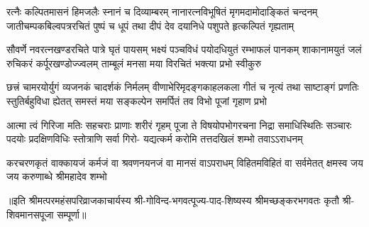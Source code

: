 
\fourlineindentedshloka
{रत्नैः कल्पितमासनं हिमजलैः स्नानं च दिव्याम्बरम्}
{नानारत्नविभूषितं मृगमदामोदाङ्कितं चन्दनम्}
{जातीचम्पकबिल्वपत्ररचितं पुष्पं च धूपं तथा}
{दीपं देव दयानिधे पशुपते हृत्कल्पितं गृह्यताम्}

\fourlineindentedshloka
{सौवर्णे नवरत्नखण्डरचिते पात्रे घृतं पायसम्}
{भक्ष्यं पञ्चविधं पयोदधियुतं रम्भाफलं पानकम्}
{शाकानामयुतं जलं रुचिकरं कर्पूरखण्डोज्ज्वलम्}
{ताम्बूलं मनसा मया विरचितं भक्त्या प्रभो स्वीकुरु}

\fourlineindentedshloka
{छत्त्रं चामरयोर्युगं व्यजनकं चादर्शकं निर्मलम्}
{वीणाभेरिमृदङ्गकाहलकला गीतं च नृत्यं तथा}
{साष्टाङ्गं प्रणतिः स्तुतिर्बहुविधा ह्येतत् समस्तं मया}
{सङ्कल्पेन समर्पितं तव विभो पूजां गृहाण प्रभो}

\fourlineindentedshloka
{आत्मा त्वं गिरिजा मतिः सहचराः प्राणाः शरीरं गृहम्}
{पूजा ते विषयोपभोगरचना निद्रा समाधिस्थितिः}
{सञ्चारः पदयोः प्रदक्षिणविधिः स्तोत्राणि सर्वा गिरो-}
{यद्यत्कर्म करोमि तत्तदखिलं शम्भो तवाऽऽराधनम्}

\fourlineindentedshloka
{करचरणकृतं वाक्कायजं कर्मजं वा}
{श्रवणनयनजं वा मानसं वाऽपराधम्}
{विहितमविहितं वा सर्वमेतत् क्षमस्व}
{जय जय करुणाब्धे श्रीमहादेव शम्भो}

॥इति  श्रीमत्परमहंसपरिव्राजकाचार्यस्य श्री-गोविन्द-भगवत्पूज्य-पाद-शिष्यस्य
श्रीमच्छङ्करभगवतः कृतौ श्री-शिवमानसपूजा सम्पूर्णा॥